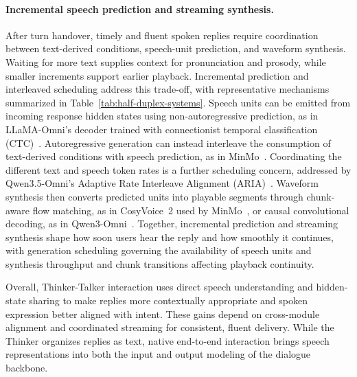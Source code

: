 \paragraph{Incremental speech prediction and streaming synthesis.}
After turn handover, timely and fluent spoken replies require coordination between text-derived conditions, speech-unit prediction, and waveform synthesis. Waiting for more text supplies context for pronunciation and prosody, while smaller increments support earlier playback. Incremental prediction and interleaved scheduling address this trade-off, with representative mechanisms summarized in Table~\ref{tab:half-duplex-systems}. Speech units can be emitted from incoming response hidden states using non-autoregressive prediction, as in LLaMA-Omni's decoder trained with connectionist temporal classification (CTC)~\citep{DBLP:conf/iclr/FangGZMZ025}. Autoregressive generation can instead interleave the consumption of text-derived conditions with speech prediction, as in MinMo~\citep{DBLP:journals/corr/abs-2501-06282}. Coordinating the different text and speech token rates is a further scheduling concern, addressed by Qwen3.5-Omni's Adaptive Rate Interleave Alignment (ARIA)~\citep{DBLP:journals/corr/abs-2604-15804}. Waveform synthesis then converts predicted units into playable segments through chunk-aware flow matching, as in CosyVoice~2 used by MinMo~\citep{DBLP:journals/corr/abs-2412-10117}, or causal convolutional decoding, as in Qwen3-Omni~\citep{DBLP:journals/corr/abs-2509-17765}. Together, incremental prediction and streaming synthesis shape how soon users hear the reply and how smoothly it continues, with generation scheduling governing the availability of speech units and synthesis throughput and chunk transitions affecting playback continuity.

Overall, Thinker-Talker interaction uses direct speech understanding and hidden-state sharing to make replies more contextually appropriate and spoken expression better aligned with intent. These gains depend on cross-module alignment and coordinated streaming for consistent, fluent delivery. While the Thinker organizes replies as text, native end-to-end interaction brings speech representations into both the input and output modeling of the dialogue backbone.





